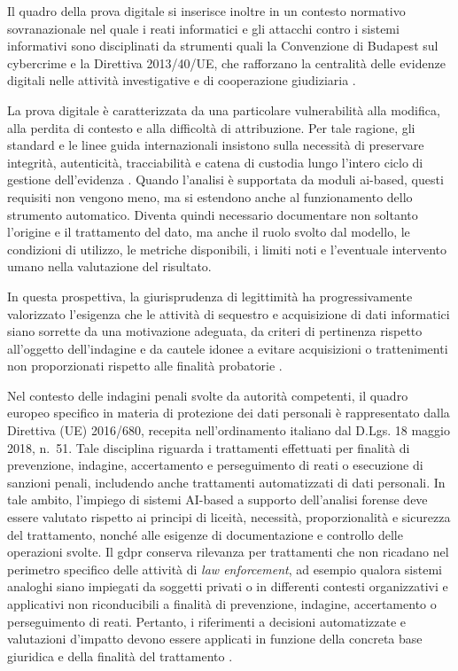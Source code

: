Il quadro della prova digitale si inserisce inoltre in un contesto normativo sovranazionale nel quale i reati informatici e gli attacchi contro i sistemi informativi sono disciplinati da strumenti quali la Convenzione di Budapest sul cybercrime e la Direttiva 2013/40/UE, che rafforzano la centralità delle evidenze digitali nelle attività investigative e di cooperazione giudiziaria \cite{budapest2001convention,directive2013cyber}.

La prova digitale è caratterizzata da una particolare vulnerabilità alla modifica, alla perdita di contesto e alla difficoltà di attribuzione. Per tale ragione, gli standard e le linee guida internazionali insistono sulla necessità di preservare integrità, autenticità, tracciabilità e catena di custodia lungo l'intero ciclo di gestione dell'evidenza \cite{iso27037,enfsi2022}. Quando l'analisi è supportata da moduli \gls{ai}-based, questi requisiti non vengono meno, ma si estendono anche al funzionamento dello strumento automatico. Diventa quindi necessario documentare non soltanto l'origine e il trattamento del dato, ma anche il ruolo svolto dal modello, le condizioni di utilizzo, le metriche disponibili, i limiti noti e l'eventuale intervento umano nella valutazione del risultato.

In questa prospettiva, la giurisprudenza di legittimità ha progressivamente valorizzato l'esigenza che le attività di sequestro e acquisizione di dati informatici siano sorrette da una motivazione adeguata, da criteri di pertinenza rispetto all'oggetto dell'indagine e da cautele idonee a evitare acquisizioni o trattenimenti non proporzionati rispetto alle finalità probatorie \cite{cassazione2020,cassazione2025}.

Nel contesto delle indagini penali svolte da autorità competenti, il quadro europeo specifico in materia di protezione dei dati personali è rappresentato dalla Direttiva (UE) 2016/680, recepita nell'ordinamento italiano dal D.Lgs. 18 maggio 2018, n.~51. Tale disciplina riguarda i trattamenti effettuati per finalità di prevenzione, indagine, accertamento e perseguimento di reati o esecuzione di sanzioni penali, includendo anche trattamenti automatizzati di dati personali. In tale ambito, l'impiego di sistemi AI-based a supporto dell'analisi forense deve essere valutato rispetto ai principi di liceità, necessità, proporzionalità e sicurezza del trattamento, nonché alle esigenze di documentazione e controllo delle operazioni svolte. Il \gls{gdpr} conserva rilevanza per trattamenti che non ricadano nel perimetro specifico delle attività di \textit{law enforcement}, ad esempio qualora sistemi analoghi siano impiegati da soggetti privati o in differenti contesti organizzativi e applicativi non riconducibili a finalità di prevenzione, indagine, accertamento o perseguimento di reati. Pertanto, i riferimenti a decisioni automatizzate e valutazioni d'impatto devono essere applicati in funzione della concreta base giuridica e della finalità del trattamento \cite{directive2016led,dlgs2018_51,gdpr2016}.

